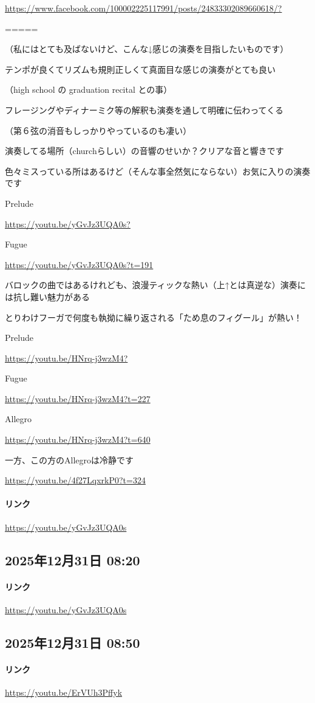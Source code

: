 \url{https://www.facebook.com/100002225117991/posts/24833302089660618/?}

=====

（私にはとても及ばないけど、こんな↓感じの演奏を目指したいものです）

テンポが良くてリズムも規則正しくて真面目な感じの演奏がとても良い

（high school の graduation recital との事）

フレージングやディナーミク等の解釈も演奏を通して明確に伝わってくる

（第６弦の消音もしっかりやっているのも凄い）

演奏してる場所（churchらしい）の音響のせいか？クリアな音と響きです

色々ミスっている所はあるけど（そんな事全然気にならない）お気に入りの演奏です

Prelude

\url{https://youtu.be/yGvJz3UQA0s?}

Fugue

\url{https://youtu.be/yGvJz3UQA0s?t=191}

バロックの曲ではあるけれども、浪漫ティックな熱い（上↑とは真逆な）演奏には抗し難い魅力がある

とりわけフーガで何度も執拗に繰り返される「ため息のフィグール」が熱い！

Prelude

\url{https://youtu.be/HNrq-j3wzM4?}

Fugue

\url{https://youtu.be/HNrq-j3wzM4?t=227}

Allegro

\url{https://youtu.be/HNrq-j3wzM4?t=640}

一方、この方のAllegroは冷静です

\url{https://youtu.be/4f27LqxrkP0?t=324}

\paragraph{リンク}
\url{https://youtu.be/yGvJz3UQA0s}

\subsection*{2025年12月31日 08:20}

\paragraph{リンク}
\url{https://youtu.be/yGvJz3UQA0s}

\subsection*{2025年12月31日 08:50}

\paragraph{リンク}
\url{https://youtu.be/ErVUh3Pffyk}

